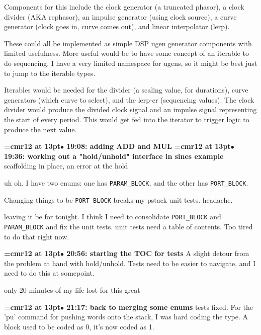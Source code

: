 Components for this include the clock generator (a truncated phasor), a clock divider (AKA rephasor), an impulse generator (using clock source), a curve generator (clock goes in, curve comes out), and linear interpolator (lerp).
\par

These could all be implemented as simple DSP ugen generator components with limited usefulness. More useful would be to have some concept of an iterable to do sequencing. I have a very limited namespace for ugens, so it might be best just to jump to the iterable types.
\par

Iterables would be needed for the divider (a scaling value, for durations), curve generators (which curve to select), and the lerp-er (sequencing values). The clock divider would produce the divided clock signal and an impulse signal representing the start of every period. This would get fed into the iterator to trigger logic to produce the next value.
\par

{\smallskip\noindent\bf\font\titlefont=cmr12 at 13pt\titlefont $\bullet$ 19:08: adding ADD and MUL}\smallskip
{\smallskip\noindent\bf\font\titlefont=cmr12 at 13pt\titlefont $\bullet$ 19:36: working out a "hold/unhold" interface in sines example}\smallskip
scaffolding in place, an error at the hold
\par

uh oh. I have two enums: one has {\tt PARAM\_BLOCK}, and the other has {\tt PORT\_BLOCK}.
\par

Changing things to be {\tt PORT\_BLOCK} breaks my pstack unit tests. headache.
\par

leaving it be for tonight. I think I need to consolidate {\tt PORT\_BLOCK} and {\tt PARAM\_BLOCK} and fix the unit tests. unit tests need a table of contents. Too tired to do that right now.
\par

{\smallskip\noindent\bf\font\titlefont=cmr12 at 13pt\titlefont $\bullet$ 20:56: starting the TOC for tests}\smallskip
A slight detour from the problem at hand with hold/unhold. Tests need to be easier to navigate, and I need to do this at somepoint.
\par

only 20 minutes of my life lost for this great
\par

{\smallskip\noindent\bf\font\titlefont=cmr12 at 13pt\titlefont $\bullet$ 21:17: back to merging some enums}\smallskip
tests fixed. For the 'pu' command for pushing words onto the stack, I was hard coding the type. A block used to be coded as 0, it's now coded as 1.
\par


